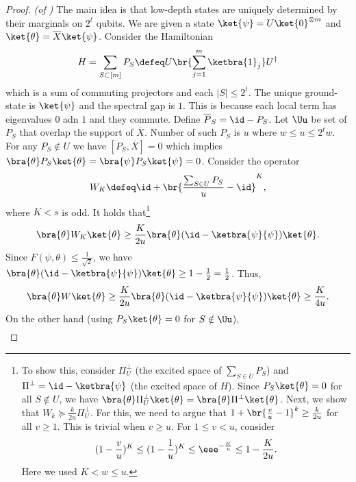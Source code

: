 \documentclass{toc}
\begin{document}
\begin{proof}\textit{(of )}
The main idea is that low-depth states are uniquely determined by their marginals on $2^t$ qubits. We are given a state $\ket{\psi}=U\ket{0}^{\otimes m}$ and $\ket{\theta}=\overline{X}\ket{\psi}$. Consider the Hamiltonian 
\begin{align}H=\sum_{S\subset [m]}P_S \defeq U\br{\sum_{j=1}^m \ketbra{1}_j}U^{\dagger}
\end{align}
which is a sum of commuting projectors and each $|S|\leq 2^t$. The unique ground-state is $\ket{\psi}$ and the spectral gap is $1$. This is because each local term has eigenvalues $0$ adn $1$ and they commute. Define $\overline{P}_S=\id-P_S$. Let $\Uu$ be set of $P_S$ that overlap the support of $\overline{X}$. Number of such $P_S$ is $u$ where $w\leq u\leq 2^t w$. For any $P_S\notin U$ we have $[P_S, \overline{X}]=0$ which implies $\bra{\theta}P_S\ket{\theta}=\bra{\psi}P_S\ket{\psi}=0$. Consider the operator
\begin{align}W_K \defeq \id + \br{\frac{\sum_{S\in U}P_S}{u}-\id}^K ,\end{align}
where $K< s$ is odd. It holds that\footnote{To show this, consider $\Pi^{\perp}_U$ (the excited space of $\sum_{S\in U}P_S$) and $\Pi^{\perp}=\id-\ketbra{\psi}$ (the excited space of $H$). Since $P_S\ket{\theta}=0$ for all $S\notin U$, we have $\bra{\theta}\Pi^{\perp}_U\ket{\theta}=\bra{\theta}\Pi^{\perp}\ket{\theta}$. Next, we show that $W_k\succeq \frac{k}{2u}\Pi^{\perp}_U$. For this, we need to argue that $1+\br{\frac{v}{u}-1}^k \geq \frac{k}{2u}$ for all $v\geq 1$. This is trivial when $v\geq u$. For $1\leq v < u$, consider 
\begin{align}
(1-\frac{v}{u})^K\leq (1-\frac{1}{u})^K\leq \eee^{-\frac{K}{u}}\leq 1-\frac{K}{2u}.
\end{align}Here we used $K<w\leq u$.} \begin{align}\bra{\theta}W_K\ket{\theta} \geq \frac{K}{2u}\bra{\theta}(\id - \ketbra{\psi}{\psi})\ket{\theta}.\end{align}
Since $F(\psi,\theta)\leq \frac{1}{\sqrt{2}}$, we have $\bra{\theta} (\id-\ketbra{\psi}{\psi}) \ket{\theta} \geq 1-\frac{1}{2}= \frac{1}{2}$. Thus, 
\begin{align}\bra{\theta}W\ket{\theta} \geq \frac{K}{2u}\bra{\theta} (\id-\ketbra{\psi}{\psi}) \ket{\theta} \geq \frac{K}{4u}.\end{align}
On the other hand (using $P_S\ket{\theta}=0$ for $S\notin \Uu$), 
\begin{align}

\end{align}
\end{proof}
\end{document}
